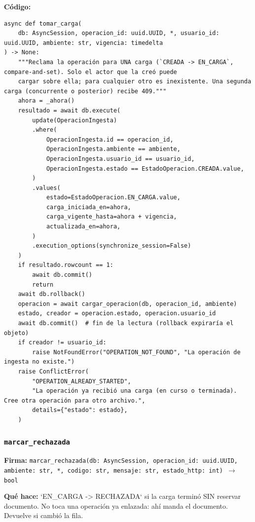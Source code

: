 \documentclass[11pt,a4paper]{article}
\begin{document}
\textbf{Código:}
\begin{lstlisting}
async def tomar_carga(
    db: AsyncSession, operacion_id: uuid.UUID, *, usuario_id: uuid.UUID, ambiente: str, vigencia: timedelta
) -> None:
    """Reclama la operación para UNA carga (`CREADA -> EN_CARGA`, compare-and-set). Solo el actor que la creó puede
    cargar sobre ella; para cualquier otro es inexistente. Una segunda carga (concurrente o posterior) recibe 409."""
    ahora = _ahora()
    resultado = await db.execute(
        update(OperacionIngesta)
        .where(
            OperacionIngesta.id == operacion_id,
            OperacionIngesta.ambiente == ambiente,
            OperacionIngesta.usuario_id == usuario_id,
            OperacionIngesta.estado == EstadoOperacion.CREADA.value,
        )
        .values(
            estado=EstadoOperacion.EN_CARGA.value,
            carga_iniciada_en=ahora,
            carga_vigente_hasta=ahora + vigencia,
            actualizada_en=ahora,
        )
        .execution_options(synchronize_session=False)
    )
    if resultado.rowcount == 1:
        await db.commit()
        return
    await db.rollback()
    operacion = await cargar_operacion(db, operacion_id, ambiente)
    estado, creador = operacion.estado, operacion.usuario_id
    await db.commit()  # fin de la lectura (rollback expiraría el objeto)
    if creador != usuario_id:
        raise NotFoundError("OPERATION_NOT_FOUND", "La operación de ingesta no existe.")
    raise ConflictError(
        "OPERATION_ALREADY_STARTED",
        "La operación ya recibió una carga (en curso o terminada). Cree otra operación para otro archivo.",
        details={"estado": estado},
    )
\end{lstlisting}

\subsubsection*{\texttt{marcar\_rechazada}}
\textbf{Firma:} \texttt{marcar\_rechazada(db: AsyncSession, operacion\_id: uuid.UUID, ambiente: str, *, codigo: str, mensaje: str, estado\_http: int) $\rightarrow$ bool}

\textbf{Qué hace:} `EN\_CARGA -> RECHAZADA` si la carga terminó SIN reservar documento. No toca una operación ya enlazada:
ahí manda el documento. Devuelve si cambió la fila.
\end{document}
